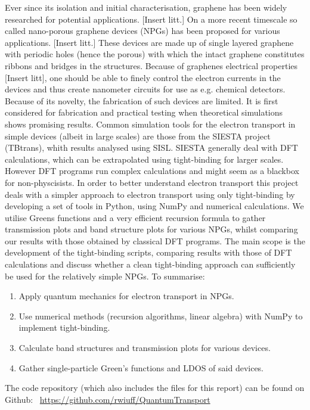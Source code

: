 Ever since its isolation and initial characterisation, graphene has been widely researched for potential applications. [Insert litt.] On a more recent timescale so called nano-porous graphene devices (NPGs) has been proposed for various applications. [Insert litt.] These devices are made up of single layered graphene with periodic holes (hence the porous) with which the intact graphene constitutes ribbons and bridges in the structures. Because of graphenes electrical properties [Insert litt], one should be able to finely control the electron currents in the devices and thus create nanometer circuits for use as e.g. chemical detectors. Because of its novelty, the fabrication of such devices are limited. It is first considered for fabrication and practical testing when theoretical simulations shows promising results. Common simulation tools for the electron transport in simple devices (albeit in large scales) are those from the SIESTA project (TBtrans), whith results analysed using SISL\cite{zerothi_sisl}. SIESTA generally deal with DFT calculations, which can be extrapolated using tight-binding for larger scales\cite{calogero_electron_2019}. However DFT programs run complex calculations and might seem as a blackbox for non-physcisists. In order to better understand electron transport this project deals with a simpler approach to electron transport using only tight-binding by developing a set of tools in Python, using NumPy and numerical calculations. We utilise Greens functions and a very efficient recursion formula to gather transmission plots and band structure plots for various NPGs, whilst comparing our results with those obtained by classical DFT programs. The main scope is the development of the tight-binding scripts, comparing results with those of DFT calculations and discuss whether a clean tight-binding approach can sufficiently be used for the relatively simple NPGs.
To summarise:
\begin{enumerate}
    \item Apply quantum mechanics for electron transport in NPGs.
    \item Use numerical methods (recursion algorithms, linear algebra) with NumPy to implement tight-binding.
    \item Calculate band structures and transmission plots for various devices.
    \item Gather single-particle Green’s functions and LDOS of said devices.
\end{enumerate}



The code repository (which also includes the \latex files for this report) can be found on Github: \faGithub \ \url{https://github.com/rwiuff/QuantumTransport}